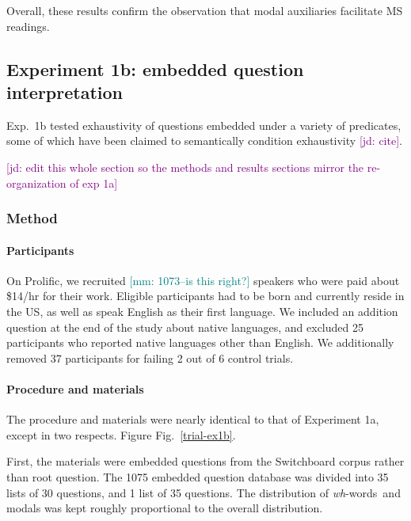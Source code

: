 \documentclass[12pt,letterpaper,table,svgnames,dvipsnames]{article}
\newcommand{\jd}[1]{\textcolor{Purple}{[jd: #1]}}
\newcommand{\mm}[1]{\textcolor{teal}{[mm: #1]}}
\newcommand{\figref}[1]{Fig.~\ref{#1}}
\newcommand{\whws}{\emph{wh}-words~}
\begin{document}

Overall, these results confirm the observation that modal auxiliaries facilitate MS readings. 

\subsection{Experiment 1b: embedded question interpretation}

Exp.~1b tested exhaustivity of questions embedded under a variety of predicates, some of which have been claimed to semantically condition exhaustivity \jd{cite}.

\jd{edit this whole section so the methods and results sections mirror the re-organization of exp 1a}

\subsubsection{Method}

\paragraph{Participants}
On Prolific, we recruited \mm{1073--is this right?} speakers who were paid about \$14/hr for their work. Eligible participants had to be born and currently reside in the US, as well as speak English as their first language. We included an addition question at the end of the study about native languages, and excluded 25 participants who reported native languages other than English. We additionally removed 37 participants for failing 2 out of 6 control trials.

\paragraph{Procedure and materials}
The procedure and materials were nearly identical to that of Experiment 1a, except in two respects. Figure \figref{trial-ex1b}.

First, the materials were embedded questions from the Switchboard corpus rather than root question. The 1075 embedded question database was divided into 35 lists of 30 questions, and 1 list of 35 questions. The distribution of \whws and modals was kept roughly proportional to the overall distribution.
\end{document}
